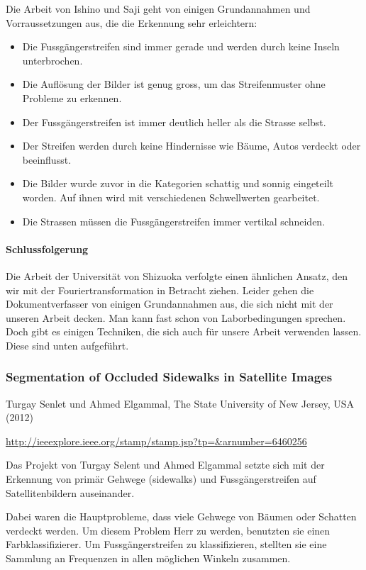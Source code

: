 Die Arbeit von Ishino und Saji geht von einigen Grundannahmen und Vorraussetzungen aus, die die Erkennung sehr erleichtern:

\begin{itemize}
	\item Die Fussgängerstreifen sind immer gerade und werden durch keine Inseln unterbrochen.
	\item Die Auflösung der Bilder ist genug gross, um das Streifenmuster ohne Probleme zu erkennen.
	\item Der Fussgängerstreifen ist immer deutlich heller als die Strasse selbst.
	\item Der Streifen werden durch keine Hindernisse wie Bäume, Autos verdeckt oder beeinflusst.
	\item Die Bilder wurde zuvor in die Kategorien schattig und sonnig eingeteilt worden. Auf ihnen wird mit verschiedenen Schwellwerten gearbeitet.
	\item Die Strassen müssen die Fussgängerstreifen immer vertikal schneiden.
\end{itemize}

\paragraph{Schlussfolgerung}
Die Arbeit der Universität von Shizuoka verfolgte einen ähnlichen Ansatz, den wir mit der Fouriertransformation in Betracht ziehen. Leider gehen die Dokumentverfasser von einigen Grundannahmen aus, die sich nicht mit der unseren Arbeit decken. Man kann fast schon von Laborbedingungen sprechen.
Doch gibt es einigen Techniken, die sich auch für unsere Arbeit verwenden lassen. Diese sind unten aufgeführt.

\subsubsection{Segmentation of Occluded Sidewalks in Satellite Images}
Turgay Senlet und Ahmed Elgammal, The State University of New Jersey, USA (2012) \newline

\onehalfspacing
\url{http://ieeexplore.ieee.org/stamp/stamp.jsp?tp=\&arnumber=6460256}
\onehalfspacing
\newline


Das Projekt von Turgay Selent und Ahmed Elgammal setzte sich mit der Erkennung von primär Gehwege (sidewalks) und Fussgängerstreifen auf Satellitenbildern auseinander.

Dabei waren die Hauptprobleme, dass viele Gehwege von Bäumen oder Schatten verdeckt werden. Um diesem Problem Herr zu werden, benutzten sie einen Farbklassifizierer.
Um Fussgängerstreifen zu klassifizieren, stellten sie eine Sammlung an Frequenzen in allen möglichen Winkeln zusammen. 

